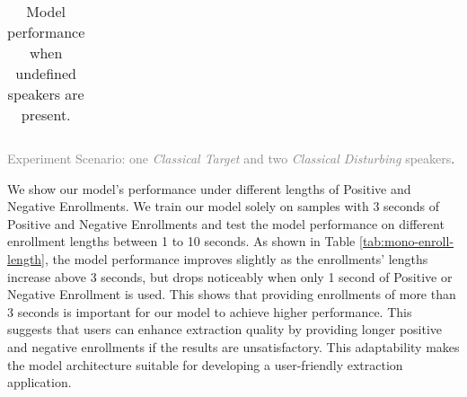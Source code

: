 \begin{table*}[!t]
\begin{center}
\begin{minipage}{0.7\textwidth}
{\begin{tabular}{llcccccc}
\bottomrule
\end{tabular}}
\end{minipage}
\hfill
\begin{minipage}{0.29\textwidth}
\caption{Model performance when undefined speakers are present.}
\vskip 0.1in
\label{tab:undefined}
\end{minipage}
\end{center}
\vskip -0.1in
\end{table*}

\textcolor{gray}{Experiment Scenario: one \textit{Classical Target} and two \textit{Classical Disturbing} speakers}.

We show our model's performance under different lengths of Positive and Negative Enrollments. We train our model solely on samples with 3 seconds of Positive and Negative Enrollments and test the model performance on different enrollment lengths between 1 to 10 seconds. As shown in Table \ref{tab:mono-enroll-length}, the model performance improves slightly as the enrollments' lengths increase above 3 seconds, but drops noticeably when only 1 second of Positive or Negative Enrollment is used. This shows that providing enrollments of more than 3 seconds is important for our model to achieve higher performance. This suggests that users can enhance extraction quality by providing longer positive and negative enrollments if the results are unsatisfactory. This adaptability makes the model architecture suitable for developing a user-friendly extraction application.



